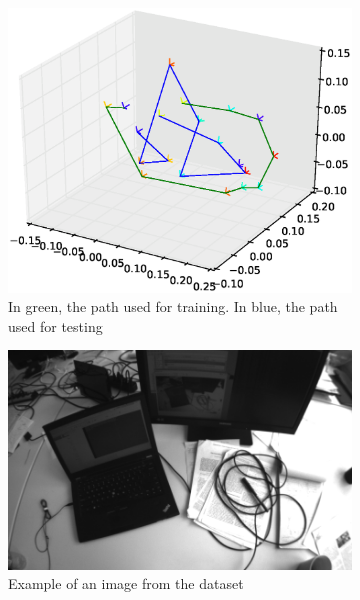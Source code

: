 \begin{figure}[htpb]
  \begin{subfigure}[b]{6cm}
          \includegraphics[width=\linewidth]{img/desktop_2_train_test.eps}
          \caption{In green, the path used for training. In blue, the path used for testing}                
          \label{fig:desktop_2_train_test}
  \end{subfigure}   
  \qquad
  \begin{subfigure}[b]{5cm}
         \includegraphics[width=\linewidth]{img/image00654.png}
         \caption{Example of an image from the dataset}                
         \label{fig:desktop_2_example_image}
  \end{subfigure}
  \caption{}
\end{figure}

